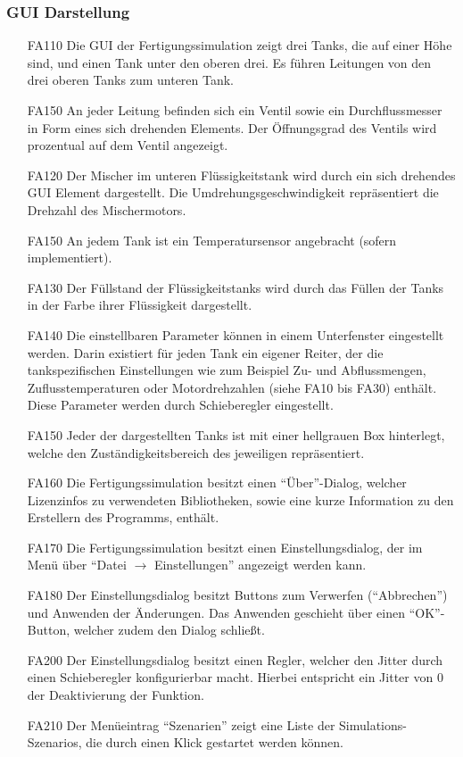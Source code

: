 \documentclass[parskip=full]{scrartcl}
\begin{document}
\subsubsection{GUI Darstellung}
\begin{enumerate}
  \item[FA110] Die \gls{GUI} der \gls{Fertigungssimulation} zeigt drei Tanks, die auf einer Höhe sind, und einen Tank unter den oberen drei.
    Es führen Leitungen von den drei oberen Tanks zum unteren Tank.
  \item[FA150] An jeder Leitung befinden sich ein Ventil sowie ein Durchflussmesser in Form eines sich drehenden Elements. Der Öffnungsgrad des Ventils wird prozentual auf dem Ventil angezeigt.
  \item[FA120] Der Mischer im unteren Flüssigkeitstank wird durch ein sich drehendes GUI Element dargestellt.
    Die Umdrehungsgeschwindigkeit repräsentiert die Drehzahl des Mischermotors.
  \item[FA150] An jedem Tank ist ein Temperatursensor angebracht (sofern implementiert).
  \item[FA130] Der Füllstand der Flüssigkeitstanks wird durch das Füllen der Tanks in der Farbe ihrer Flüssigkeit dargestellt.
  \item[FA140] Die einstellbaren Parameter können in einem Unterfenster eingestellt werden. Darin existiert für jeden Tank ein eigener Reiter, der die 
    tankspezifischen Einstellungen wie zum Beispiel Zu- und Abflussmengen, Zuflusstemperaturen oder Motordrehzahlen (siehe FA10 bis FA30) enthält.
    Diese Parameter werden durch Schieberegler eingestellt.
  \item[FA150] Jeder der dargestellten Tanks ist mit einer hellgrauen Box hinterlegt, welche den Zuständigkeitsbereich des jeweiligen  repräsentiert.
  \item[FA160] Die \gls{Fertigungssimulation} besitzt einen "`Über"'-Dialog, welcher Lizenzinfos zu verwendeten Bibliotheken,
    sowie eine kurze Information zu den Erstellern des Programms, enthält.
  \item[FA170] Die \gls{Fertigungssimulation} besitzt einen Einstellungsdialog, der im Menü über "`Datei $\rightarrow$ Einstellungen"' angezeigt werden kann.
  \item[FA180] Der Einstellungsdialog besitzt Buttons zum Verwerfen ("`Abbrechen"') und Anwenden der Änderungen. Das Anwenden geschieht über einen "`OK"'-Button, welcher zudem den Dialog schließt.
  \item[FA200] Der Einstellungsdialog besitzt einen Regler, welcher den \gls{Jitter} durch einen Schieberegler konfigurierbar macht.
    Hierbei entspricht ein \gls{Jitter} von 0 der Deaktivierung der Funktion.
  \item[FA210] Der Menüeintrag "`Szenarien"' zeigt eine Liste der \glspl{Simulations-Szenario}, die durch einen Klick gestartet werden können.
\end{enumerate}
\end{document}
